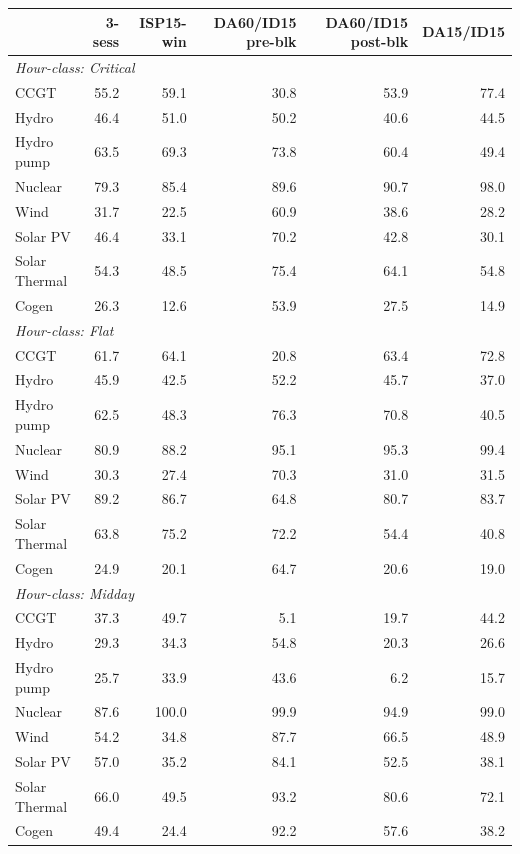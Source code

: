 \begin{tabular}{l r r r r r}
\toprule
 & 3-sess & ISP15-win & DA60/ID15 pre-blk & DA60/ID15 post-blk & DA15/ID15 \\
\midrule
\multicolumn{6}{l}{\textit{Hour-class: Critical}} \\
CCGT & 55.2 & 59.1 & 30.8 & 53.9 & 77.4 \\
Hydro & 46.4 & 51.0 & 50.2 & 40.6 & 44.5 \\
Hydro pump & 63.5 & 69.3 & 73.8 & 60.4 & 49.4 \\
Nuclear & 79.3 & 85.4 & 89.6 & 90.7 & 98.0 \\
Wind & 31.7 & 22.5 & 60.9 & 38.6 & 28.2 \\
Solar PV & 46.4 & 33.1 & 70.2 & 42.8 & 30.1 \\
Solar Thermal & 54.3 & 48.5 & 75.4 & 64.1 & 54.8 \\
Cogen & 26.3 & 12.6 & 53.9 & 27.5 & 14.9 \\
\midrule
\multicolumn{6}{l}{\textit{Hour-class: Flat}} \\
CCGT & 61.7 & 64.1 & 20.8 & 63.4 & 72.8 \\
Hydro & 45.9 & 42.5 & 52.2 & 45.7 & 37.0 \\
Hydro pump & 62.5 & 48.3 & 76.3 & 70.8 & 40.5 \\
Nuclear & 80.9 & 88.2 & 95.1 & 95.3 & 99.4 \\
Wind & 30.3 & 27.4 & 70.3 & 31.0 & 31.5 \\
Solar PV & 89.2 & 86.7 & 64.8 & 80.7 & 83.7 \\
Solar Thermal & 63.8 & 75.2 & 72.2 & 54.4 & 40.8 \\
Cogen & 24.9 & 20.1 & 64.7 & 20.6 & 19.0 \\
\midrule
\multicolumn{6}{l}{\textit{Hour-class: Midday}} \\
CCGT & 37.3 & 49.7 & 5.1 & 19.7 & 44.2 \\
Hydro & 29.3 & 34.3 & 54.8 & 20.3 & 26.6 \\
Hydro pump & 25.7 & 33.9 & 43.6 & 6.2 & 15.7 \\
Nuclear & 87.6 & 100.0 & 99.9 & 94.9 & 99.0 \\
Wind & 54.2 & 34.8 & 87.7 & 66.5 & 48.9 \\
Solar PV & 57.0 & 35.2 & 84.1 & 52.5 & 38.1 \\
Solar Thermal & 66.0 & 49.5 & 93.2 & 80.6 & 72.1 \\
Cogen & 49.4 & 24.4 & 92.2 & 57.6 & 38.2 \\
\midrule
\bottomrule
\end{tabular}
